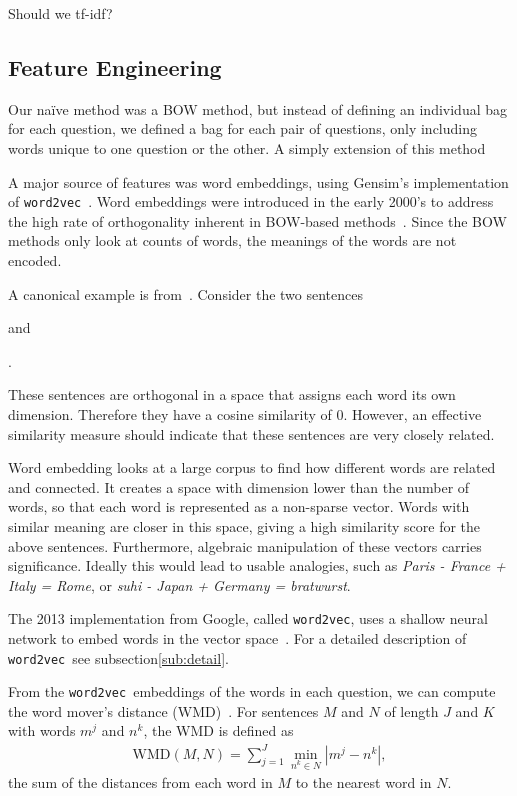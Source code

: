 \documentclass{article} %
\newcommand{\wordtvec}{\texttt{word2vec}}
\begin{document}
Should we tf-idf?

\subsection{Feature Engineering} \label{sub:features}

Our na\"ive method was a BOW method, but instead of defining an individual bag for each question, we defined a bag for each pair of questions, only including words unique to one question or the other. A simply extension of this method 

A major source of features was word embeddings, using Gensim's implementation of \wordtvec~\cite{gensim}. Word embeddings were introduced in the early 2000's to address the high rate of orthogonality inherent in BOW-based methods~\cite{Bengio03}. Since the BOW methods only look at counts of words, the meanings of the words are not encoded.

A canonical example is from~\cite{kusner15}. Consider the two sentences
\begin{center}
\end{center}
and 
\begin{center}
.
\end{center}
These sentences are orthogonal in a space that assigns each word its own dimension. Therefore they have a cosine similarity of 0. However, an effective similarity measure should indicate that these sentences are very closely related.

Word embedding looks at a large corpus to find how different words are related and connected. It creates a space with dimension lower than the number of words, so that each word is represented as a non-sparse vector. Words with similar meaning are closer in this space, giving a high similarity score for the above sentences. Furthermore, algebraic manipulation of these vectors carries significance. Ideally this would lead to usable analogies, such as \textit{Paris - France + Italy = Rome}, or \textit{suhi - Japan + Germany = bratwurst}.

The 2013 implementation from Google, called \wordtvec, uses a shallow neural network to embed words in the vector space~\cite{word2vec}. For a detailed description of \wordtvec\ see subsection\ref{sub:detail}.

From the \wordtvec\ embeddings of the words in each question, we can compute the word mover's distance (WMD)~\cite{kusner15}. For sentences $M$ and $N$ of length $J$ and $K$ with words $m^j$ and $n^k$, the WMD is defined as 
\begin{align}
\text{WMD}(M,N) = \sum_{j=1}^J\min_{n^k\in N}\left|m^j-n^k\right|,
\end{align}
the sum of the distances from each word in $M$ to the nearest word in $N$.
\end{document}
